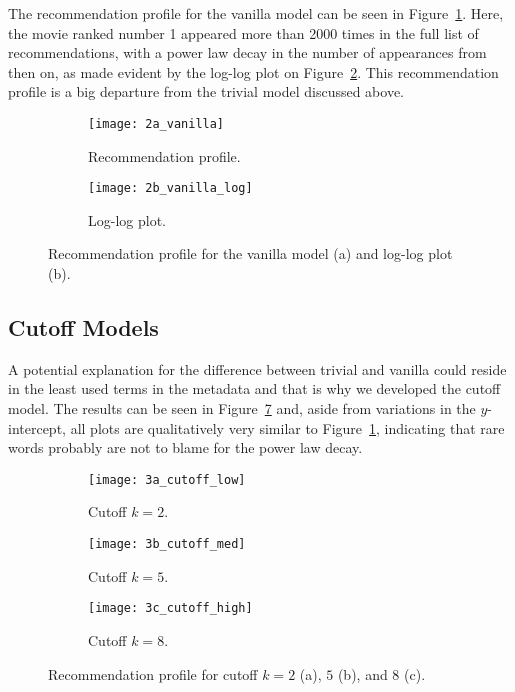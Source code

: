 The recommendation profile for the vanilla model can be seen in
Figure~\ref{fig:fig2a}. Here, the movie ranked number 1 appeared more than 2000
times in the full list of recommendations, with a power law decay in the number
of appearances from then on, as made evident by the log-log plot on
Figure~\ref{fig:fig2b}. This recommendation profile is a big departure from the
trivial model discussed above.

\begin{figure}
  \centering
  \begin{subfigure}{0.45\textwidth}
    \centering
    \texttt{[image: 2a\_vanilla]}
    \caption{Recommendation profile.\label{fig:fig2a}}
  \end{subfigure}
  \begin{subfigure}{0.45\textwidth}
    \centering
    \texttt{[image: 2b\_vanilla\_log]}
    \caption{Log-log plot.\label{fig:fig2b}}
  \end{subfigure}
  \caption{Recommendation profile for the vanilla model (a) and log-log plot
    (b).\label{fig:fig2}}
\end{figure}

\subsection{Cutoff Models}
\label{subsec:cutoff}

A potential explanation for the difference between trivial and vanilla could
reside in the least used terms in the metadata and that is why we developed the
cutoff model. The results can be seen in Figure~\ref{fig:fig3} and, aside from
variations in the $y$-intercept, all plots are qualitatively very similar to
Figure~\ref{fig:fig2a}, indicating that rare words probably are not to blame for
the power law decay.

\begin{figure}
  \centering
  \begin{subfigure}{0.3\textwidth}
    \centering
    \texttt{[image: 3a\_cutoff\_low]}
    \caption{Cutoff $k = 2$.\label{fig:fig3a}}
  \end{subfigure}
  \begin{subfigure}{0.3\textwidth}
    \centering
    \texttt{[image: 3b\_cutoff\_med]}
    \caption{Cutoff $k = 5$.\label{fig:fig3b}}
  \end{subfigure}
  \begin{subfigure}{0.3\textwidth}
    \centering
    \texttt{[image: 3c\_cutoff\_high]}
    \caption{Cutoff $k = 8$.\label{fig:fig3c}}
  \end{subfigure}
  \caption{Recommendation profile for cutoff $k = 2$ (a), $5$ (b), and $8$
    (c).\label{fig:fig3}}
\end{figure}

